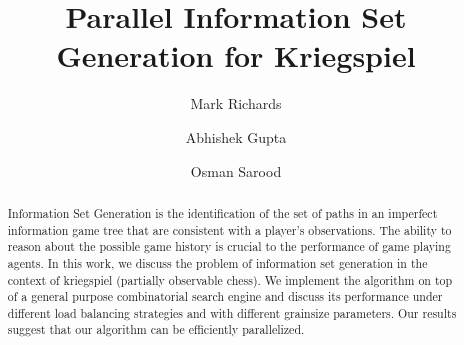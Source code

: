 \documentclass[times, 10pt,twocolumn]{article}
\begin{document}
\title{Parallel Information Set Generation for Kriegspiel 
       }

\author{Mark Richards \and Abhishek Gupta \and Osman Sarood \\
}

\maketitle
\thispagestyle{empty}



\begin{abstract}
Information Set Generation is the identification of the set of paths in an imperfect information game tree that are
consistent with a player's observations.  The ability to reason about the possible game history is crucial to the
performance of game playing agents.  In this work, we discuss the problem of information set generation in the context
of kriegspiel (partially observable chess).  We implement the algorithm on top of a general purpose combinatorial search
engine and discuss its performance under different load balancing strategies and with different grainsize parameters.
Our results suggest that our algorithm can be efficiently parallelized.  
\end{abstract}
\end{document}
